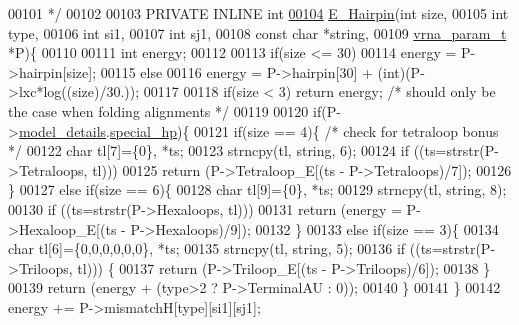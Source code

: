 \begin{DoxyCode}
00101 \textcolor{comment}{*/}
00102 
00103 PRIVATE INLINE \textcolor{keywordtype}{int}
\hypertarget{hairpin__loops_8h_source.tex_l00104}{}\hyperlink{group__loops_gadf943ee9a45b7f4cee9192c06210dace}{00104} \hyperlink{group__loops_gadf943ee9a45b7f4cee9192c06210dace}{E\_Hairpin}(\textcolor{keywordtype}{int} size,
00105           \textcolor{keywordtype}{int} type,
00106           \textcolor{keywordtype}{int} si1,
00107           \textcolor{keywordtype}{int} sj1,
00108           \textcolor{keyword}{const} \textcolor{keywordtype}{char} *\textcolor{keywordtype}{string},
00109           \hyperlink{group__energy__parameters_structvrna__param__s}{vrna\_param\_t} *P)\{
00110 
00111   \textcolor{keywordtype}{int} energy;
00112 
00113   \textcolor{keywordflow}{if}(size <= 30)
00114     energy = P->hairpin[size];
00115   \textcolor{keywordflow}{else}
00116     energy = P->hairpin[30] + (int)(P->lxc*log((size)/30.));
00117 
00118   \textcolor{keywordflow}{if}(size < 3) \textcolor{keywordflow}{return} energy; \textcolor{comment}{/* should only be the case when folding alignments */}
00119 
00120   \textcolor{keywordflow}{if}(P->\hyperlink{group__energy__parameters_a7b84353eb9075c595bad4ceb871bcae7}{model\_details}.\hyperlink{structvrna__md__s_add64a96d23e77ef1d0ddf8dfc5228143}{special\_hp})\{
00121     \textcolor{keywordflow}{if}(size == 4)\{ \textcolor{comment}{/* check for tetraloop bonus */}
00122       \textcolor{keywordtype}{char} tl[7]=\{0\}, *ts;
00123       strncpy(tl, \textcolor{keywordtype}{string}, 6);
00124       \textcolor{keywordflow}{if} ((ts=strstr(P->Tetraloops, tl)))
00125         \textcolor{keywordflow}{return} (P->Tetraloop\_E[(ts - P->Tetraloops)/7]);
00126     \}
00127     \textcolor{keywordflow}{else} \textcolor{keywordflow}{if}(size == 6)\{
00128       \textcolor{keywordtype}{char} tl[9]=\{0\}, *ts;
00129       strncpy(tl, \textcolor{keywordtype}{string}, 8);
00130       \textcolor{keywordflow}{if} ((ts=strstr(P->Hexaloops, tl)))
00131         \textcolor{keywordflow}{return} (energy = P->Hexaloop\_E[(ts - P->Hexaloops)/9]);
00132     \}
00133     \textcolor{keywordflow}{else} \textcolor{keywordflow}{if}(size == 3)\{
00134       \textcolor{keywordtype}{char} tl[6]=\{0,0,0,0,0,0\}, *ts;
00135       strncpy(tl, \textcolor{keywordtype}{string}, 5);
00136       \textcolor{keywordflow}{if} ((ts=strstr(P->Triloops, tl))) \{
00137         \textcolor{keywordflow}{return} (P->Triloop\_E[(ts - P->Triloops)/6]);
00138       \}
00139       \textcolor{keywordflow}{return} (energy + (type>2 ? P->TerminalAU : 0));
00140     \}
00141   \}
00142   energy += P->mismatchH[type][si1][sj1];

\end{DoxyCode}
